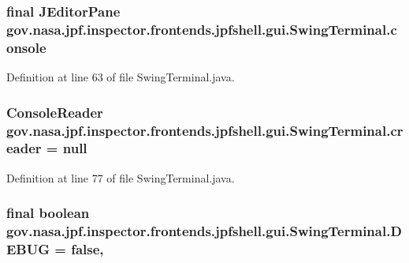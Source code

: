 \subsubsection[{\texorpdfstring{console}{console}}]{\setlength{\rightskip}{0pt plus 5cm}final J\+Editor\+Pane gov.\+nasa.\+jpf.\+inspector.\+frontends.\+jpfshell.\+gui.\+Swing\+Terminal.\+console\hspace{0.3cm}{\ttfamily [private]}}\hypertarget{classgov_1_1nasa_1_1jpf_1_1inspector_1_1frontends_1_1jpfshell_1_1gui_1_1_swing_terminal_a87c9b71bc01bfcee4d8e6741aac6bc85}{}\label{classgov_1_1nasa_1_1jpf_1_1inspector_1_1frontends_1_1jpfshell_1_1gui_1_1_swing_terminal_a87c9b71bc01bfcee4d8e6741aac6bc85}


Definition at line 63 of file Swing\+Terminal.\+java.

\subsubsection[{\texorpdfstring{creader}{creader}}]{\setlength{\rightskip}{0pt plus 5cm}Console\+Reader gov.\+nasa.\+jpf.\+inspector.\+frontends.\+jpfshell.\+gui.\+Swing\+Terminal.\+creader = null\hspace{0.3cm}{\ttfamily [private]}}\hypertarget{classgov_1_1nasa_1_1jpf_1_1inspector_1_1frontends_1_1jpfshell_1_1gui_1_1_swing_terminal_ae5664b92a4e5fd82f950269d95392107}{}\label{classgov_1_1nasa_1_1jpf_1_1inspector_1_1frontends_1_1jpfshell_1_1gui_1_1_swing_terminal_ae5664b92a4e5fd82f950269d95392107}


Definition at line 77 of file Swing\+Terminal.\+java.

\subsubsection[{\texorpdfstring{D\+E\+B\+UG}{DEBUG}}]{\setlength{\rightskip}{0pt plus 5cm}final boolean gov.\+nasa.\+jpf.\+inspector.\+frontends.\+jpfshell.\+gui.\+Swing\+Terminal.\+D\+E\+B\+UG = false\hspace{0.3cm}{\ttfamily [static]}, {\ttfamily [private]}}\hypertarget{classgov_1_1nasa_1_1jpf_1_1inspector_1_1frontends_1_1jpfshell_1_1gui_1_1_swing_terminal_a17f1bfb7c9ffd860344e7c9ee087d041}{}\label{classgov_1_1nasa_1_1jpf_1_1inspector_1_1frontends_1_1jpfshell_1_1gui_1_1_swing_terminal_a17f1bfb7c9ffd860344e7c9ee087d041}


